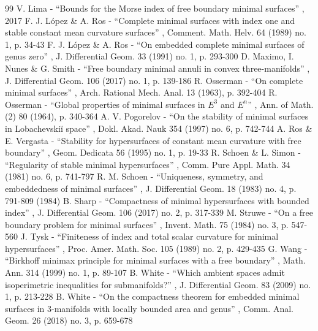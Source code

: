 \begin{thebibliography}{99}
 V. Lima - “Bounds for the Morse index of free boundary minimal surfaces” , 2017
 F. J. López \& A. Ros - “Complete minimal surfaces with index one and stable constant mean curvature surfaces” , Comment. Math. Helv. 64 (1989) no. 1, p. 34-43
 F. J. López \& A. Ros - “On embedded complete minimal surfaces of genus zero” , J. Differential Geom. 33 (1991) no. 1, p. 293-300
 D. Maximo, I. Nunes \& G. Smith - “Free boundary minimal annuli in convex three-manifolds” , J. Differential Geom. 106 (2017) no. 1, p. 139-186
 R. Osserman - “On complete minimal surfaces” , Arch. Rational Mech. Anal. 13 (1963), p. 392-404
 R. Osserman - “Global properties of minimal surfaces in $E^{3}$ and $E^{n}$” , Ann. of Math. (2) 80 (1964), p. 340-364
 A. V. Pogorelov - “On the stability of minimal surfaces in Lobachevskiĭ space” , Dokl. Akad. Nauk 354 (1997) no. 6, p. 742-744
 A. Ros \& E. Vergasta - “Stability for hypersurfaces of constant mean curvature with free boundary” , Geom. Dedicata 56 (1995) no. 1, p. 19-33
 R. Schoen \& L. Simon - “Regularity of stable minimal hypersurfaces” , Comm. Pure Appl. Math. 34 (1981) no. 6, p. 741-797
 R. M. Schoen - “Uniqueness, symmetry, and embeddedness of minimal surfaces” , J. Differential Geom. 18 (1983) no. 4, p. 791-809 (1984)
 B. Sharp - “Compactness of minimal hypersurfaces with bounded index” , J. Differential Geom. 106 (2017) no. 2, p. 317-339
 M. Struwe - “On a free boundary problem for minimal surfaces” , Invent. Math. 75 (1984) no. 3, p. 547-560
 J. Tysk - “Finiteness of index and total scalar curvature for minimal hypersurfaces” , Proc. Amer. Math. Soc. 105 (1989) no. 2, p. 429-435
 G. Wang - “Birkhoff minimax principle for minimal surfaces with a free boundary” , Math. Ann. 314 (1999) no. 1, p. 89-107
 B. White - “Which ambient spaces admit isoperimetric inequalities for submanifolds?” , J. Differential Geom. 83 (2009) no. 1, p. 213-228
 B. White - “On the compactness theorem for embedded minimal surfaces in 3-manifolds with locally bounded area and genus” , Comm. Anal. Geom. 26 (2018) no. 3, p. 659-678
\end{thebibliography}
